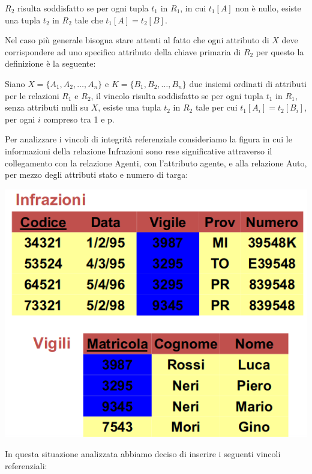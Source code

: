 \documentclass[a4paper,12pt, oneside]{book}
\begin{document}
\begin{itemize}
\begin{definizione}
            $R_2$ risulta soddisfatto se per ogni tupla $t_1$ in $R_1$, in cui $t_1[A]$ non è nullo, esiste una
            tupla $t_2$ in $R_2$ tale che $t_1[A] = t_2[B]$.
        \end{definizione}
        Nel caso più generale bisogna stare attenti al fatto che ogni attributo di $X$ deve corrispondere ad
        uno specifico attributo della chiave primaria di $R_2$ per questo la definizione è la seguente:
        \begin{definizione}
            Siano $X = \{A_1, A_2, \dots, A_n\}$ e $K = \{B_1, B_2, \dots, B_n\}$ due insiemi ordinati di
            attributi per le relazioni $R_1$ e $R_2$, il vincolo risulta soddisfatto se per ogni tupla $t_1$
            in $R_1$, senza attributi nulli su $X$, esiste una tupla $t_2$ in $R_2$ tale per cui $t_1[A_i] =
            t_2[B_i]$, per ogni $i$ compreso tra 1 e p.
        \end{definizione}
        Per analizzare i vincoli di integrità referenziale consideriamo la figura in cui le informazioni 
        della relazione Infrazioni sono rese significative attraverso il collegamento con la relazione Agenti,
        con l'attributo agente, e alla relazione Auto, per mezzo degli attributi stato e numero di targa:
        \begin{center}
        	\includegraphics[scale=0.7]{img/inf.png}
        \end{center}
        In questa situazione analizzata abbiamo deciso di inserire i seguenti vincoli referenziali:
        \begin{itemize}

\end{itemize}
\end{itemize}
\end{document}
